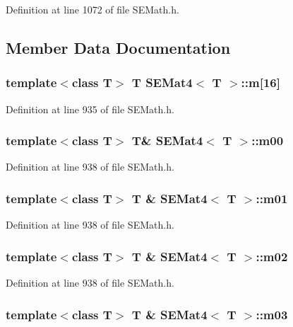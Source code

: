 Definition at line 1072 of file S\+E\+Math.\+h.



\subsection{Member Data Documentation}
\subsubsection[{m}]{\setlength{\rightskip}{0pt plus 5cm}template$<$class T$>$ T {\bf S\+E\+Mat4}$<$ T $>$\+::m[16]}\label{class_s_e_mat4_a985726f8fc444e8a76f4b78270f3f842}


Definition at line 935 of file S\+E\+Math.\+h.

\subsubsection[{m00}]{\setlength{\rightskip}{0pt plus 5cm}template$<$class T$>$ T\& {\bf S\+E\+Mat4}$<$ T $>$\+::m00}\label{class_s_e_mat4_a42bb5d90de31e28402ef9e1a4ab9a6d0}


Definition at line 938 of file S\+E\+Math.\+h.

\subsubsection[{m01}]{\setlength{\rightskip}{0pt plus 5cm}template$<$class T$>$ T \& {\bf S\+E\+Mat4}$<$ T $>$\+::m01}\label{class_s_e_mat4_a7441bd59f5df926ebd75f4c555693965}


Definition at line 938 of file S\+E\+Math.\+h.

\subsubsection[{m02}]{\setlength{\rightskip}{0pt plus 5cm}template$<$class T$>$ T \& {\bf S\+E\+Mat4}$<$ T $>$\+::m02}\label{class_s_e_mat4_a60fc5b57b1795899b52ec5a7f9ac2897}


Definition at line 938 of file S\+E\+Math.\+h.

\subsubsection[{m03}]{\setlength{\rightskip}{0pt plus 5cm}template$<$class T$>$ T \& {\bf S\+E\+Mat4}$<$ T $>$\+::m03}\label{class_s_e_mat4_a5b4ec437eaf98922cdb8421402af1e3e}


